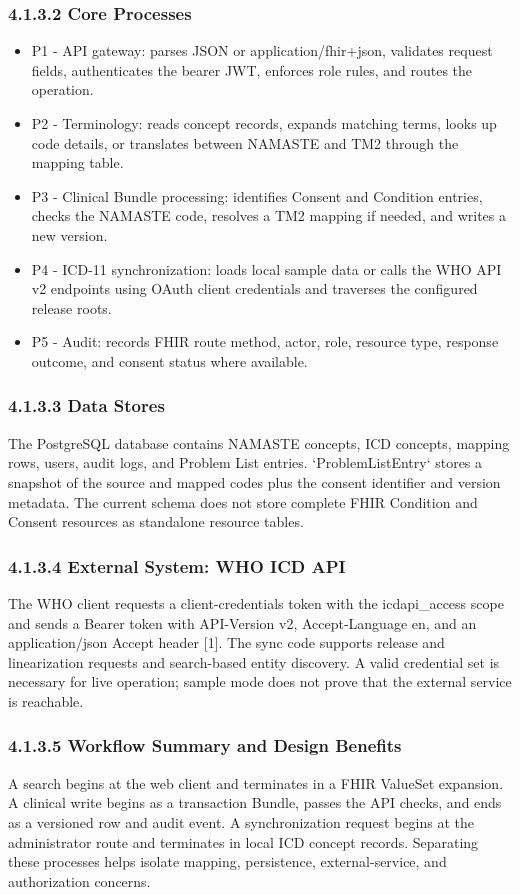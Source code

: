 \documentclass[12pt,a4paper,oneside]{report}
\begin{document}
\subsubsection*{4.1.3.2 Core Processes}
\begin{itemize}
\item P1 - API gateway: parses JSON or application/fhir+json, validates request fields, authenticates the bearer JWT, enforces role rules, and routes the operation.
\item P2 - Terminology: reads concept records, expands matching terms, looks up code details, or translates between NAMASTE and TM2 through the mapping table.
\item P3 - Clinical Bundle processing: identifies Consent and Condition entries, checks the NAMASTE code, resolves a TM2 mapping if needed, and writes a new version.
\item P4 - ICD-11 synchronization: loads local sample data or calls the WHO API v2 endpoints using OAuth client credentials and traverses the configured release roots.
\item P5 - Audit: records FHIR route method, actor, role, resource type, response outcome, and consent status where available.
\end{itemize}
\subsubsection*{4.1.3.3 Data Stores}
The PostgreSQL database contains NAMASTE concepts, ICD concepts, mapping rows, users, audit logs, and Problem List entries. `ProblemListEntry` stores a snapshot of the source and mapped codes plus the consent identifier and version metadata. The current schema does not store complete FHIR Condition and Consent resources as standalone resource tables.

\subsubsection*{4.1.3.4 External System: WHO ICD API}
The WHO client requests a client-credentials token with the icdapi\_access scope and sends a Bearer token with API-Version v2, Accept-Language en, and an application/json Accept header [1]. The sync code supports release and linearization requests and search-based entity discovery. A valid credential set is necessary for live operation; sample mode does not prove that the external service is reachable.

\subsubsection*{4.1.3.5 Workflow Summary and Design Benefits}
A search begins at the web client and terminates in a FHIR ValueSet expansion. A clinical write begins as a transaction Bundle, passes the API checks, and ends as a versioned row and audit event. A synchronization request begins at the administrator route and terminates in local ICD concept records. Separating these processes helps isolate mapping, persistence, external-service, and authorization concerns.
\end{document}
